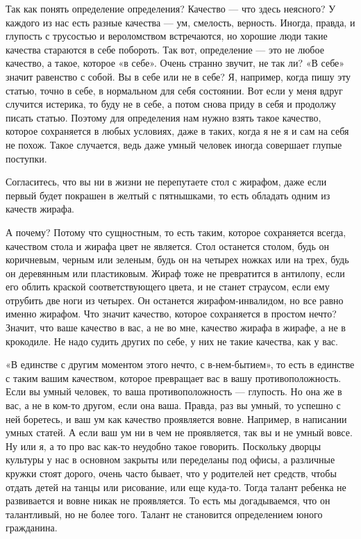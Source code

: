 Так как понять определение определения? Качество — что здесь неясного? У
каждого из нас есть разные качества — ум, смелость, верность. Иногда, правда, и
глупость с трусостью и вероломством встречаются, но хорошие люди такие качества
стараются в себе побороть. Так вот, определение — это не любое качество, а
такое, которое «в себе». Очень странно звучит, не так ли? «В себе» значит
равенство с собой. Вы в себе или не в себе? Я, например, когда пишу эту статью,
точно в себе, в нормальном для себя состоянии. Вот если у меня вдруг случится
истерика, то буду не в себе, а потом снова приду в себя и продолжу писать
статью. Поэтому для определения нам нужно взять такое качество, которое
сохраняется в любых условиях, даже в таких, когда я не я и сам на себя не
похож. Такое случается, ведь даже умный человек иногда совершает глупые
поступки.

Согласитесь, что вы ни в жизни не перепутаете стол с жирафом, даже если первый
будет покрашен в желтый с пятнышками, то есть обладать одним из качеств жирафа.

А почему? Потому что сущностным, то есть таким, которое сохраняется всегда,
качеством стола и жирафа цвет не является. Стол останется столом, будь он
коричневым, черным или зеленым, будь он на четырех ножках или на трех, будь он
деревянным или пластиковым. Жираф тоже не превратится в антилопу, если его
облить краской соответствующего цвета, и не станет страусом, если ему отрубить
две ноги из четырех. Он останется жирафом-инвалидом, но все равно именно
жирафом. Что значит качество, которое сохраняется в простом нечто? Значит, что
ваше качество в вас, а не во мне, качество жирафа в жирафе, а не в крокодиле.
Не надо судить других по себе, у них не такие качества, как у вас.

«В единстве с другим моментом этого нечто, с в-нем-бытием», то есть в единстве
с таким вашим качеством, которое превращает вас в вашу противоположность. Если
вы умный человек, то ваша противоположность — глупость. Но она же в вас, а не в
ком-то другом, если она ваша. Правда, раз вы умный, то успешно с ней боретесь,
и ваш ум как качество проявляется вовне. Например, в написании умных статей. А
если ваш ум ни в чем не проявляется, так вы и не умный вовсе. Ну или я, а то
про вас как-то неудобно такое говорить. Поскольку дворцы культуры у нас в
основном закрыты или переделаны под офисы, а различные кружки стоят дорого,
очень часто бывает, что у родителей нет средств, чтобы отдать детей на танцы
или рисование, или еще куда-то. Тогда талант ребенка не развивается и вовне
никак не проявляется. То есть мы догадываемся, что он талантливый, но не более
того. Талант не становится определением юного гражданина.

